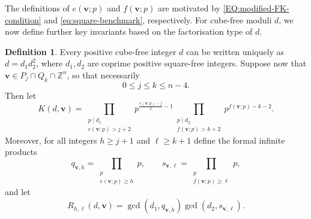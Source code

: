 \documentclass[a4paper,11pt, twoside,reqno]{amsart}
\theoremstyle{plain}
\theoremstyle{definition}
\newtheorem{defin}[thm]{Definition}
\theoremstyle{remark}
\newcommand{\bfv}{\bm{v}}
\newcommand{\ZZ}{\mathbb{Z}}
\renewcommand{\le}{\leqslant}
\renewcommand{\ge}{\geqslant}
\numberwithin{equation}{section}
\begin{document}
The definitions of $e(\bfv;p)$ and $f(\bfv;p)$
are motivated by
\eqref{EQ:modified-FK-condition} and \eqref{eq:square-benchmark},
respectively.
For cube-free moduli $d$, we now define further key invariants
based on the factorisation type of $d$.

\begin{defin}

Every positive cube-free integer $d$ can be written uniquely as
$d=d_1d_2^2$, where $d_1,d_2$ are coprime positive square-free
integers.
Suppose now that $\bfv\in P_j\cap Q_k\cap \ZZ^n$, so that necessarily
\begin{equation*}
0\le j\le k\le n-4.
\end{equation*}
Then let
\begin{equation}\label{n10:K}
K(d,\bfv)=
\prod_{\substack{p\mid d_1\\e(\bfv;p)> j+2}}
p^{\frac{e(\bfv;p)-j}{2}-1}
\prod_{\substack{p\mid d_2\\f(\bfv;p)> k+2}}
p^{f(\bfv;p)-k-2}.
\end{equation}
Moreover, for all integers $h\ge j+1$ and $\ell\ge k+1$ define the formal infinite products
\[
q_{\bfv,h}=\prod_{\substack{p\\e(\bfv;p)\ge h}}p,
\qquad
s_{\bfv,\ell}=\prod_{\substack{p\\f(\bfv;p)\ge \ell}}p,
\]
and let
\begin{equation}\label{n10:radicals}
R_{h,\ell}(d,\bfv)
= \gcd(d_1,q_{\bfv,h})
\gcd(d_2,s_{\bfv,\ell}).
\end{equation}
\end{defin}
\end{document}
